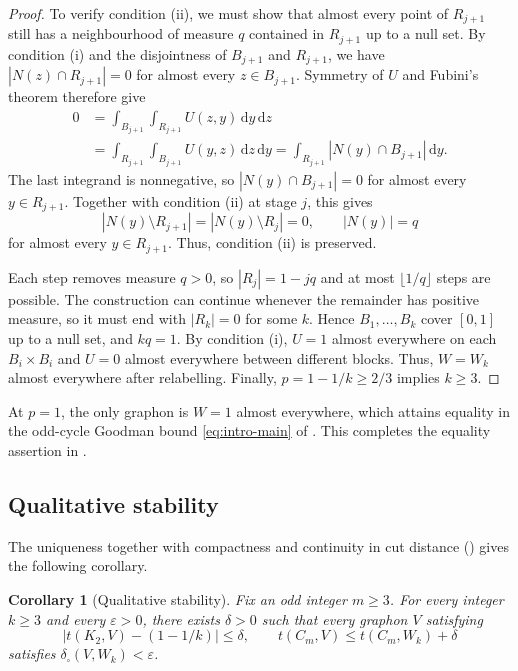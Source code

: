 \documentclass[11pt]{article}
\newtheorem{corollary}[theorem]{Corollary}
\theoremstyle{remark}
\numberwithin{equation}{section}
\newcommand{\dd}{\,\mathrm d}
\newcommand{\tC}[2]{t(C_{#1},#2)}
\newcommand{\edens}[1]{t(K_{2},#1)}
\begin{document}
\begin{proof}
  To verify condition (ii), we must show that almost every point of
  $R_{j+1}$ still has a neighbourhood of measure $q$ contained in
  $R_{j+1}$ up to a null set. By condition (i) and the disjointness of
  $B_{j+1}$ and $R_{j+1}$, we have $|N(z)\cap R_{j+1}|=0$ for almost
  every $z\in B_{j+1}$.
  Symmetry of $U$ and Fubini's theorem therefore give
  \[
    \begin{aligned}
      0&=\int_{B_{j+1}}\int_{R_{j+1}}U(z,y)\dd y\dd z\\
       &=\int_{R_{j+1}}\int_{B_{j+1}}U(y,z)\dd z\dd y
        =\int_{R_{j+1}}|N(y)\cap B_{j+1}|\dd y.
    \end{aligned}
  \]
  The last integrand is nonnegative, so $|N(y)\cap B_{j+1}|=0$
  for almost every $y\in R_{j+1}$. Together with condition (ii) at
  stage $j$, this gives
  \[
    |N(y)\setminus R_{j+1}|=|N(y)\setminus R_j|=0,
    \qquad |N(y)|=q
  \]
  for almost every $y\in R_{j+1}$. Thus, condition (ii) is preserved.

  Each step removes measure $q>0$, so $|R_j|=1-jq$ and at most
  $\lfloor1/q\rfloor$ steps are possible. The construction can continue
  whenever the remainder has positive measure, so it must end with
  $|R_k|=0$ for some $k$. Hence $B_1,\ldots,B_k$ cover $[0,1]$ up to
  a null set, and $kq=1$. By condition (i), $U=1$ almost everywhere on
  each $B_i\times B_i$ and $U=0$ almost everywhere between different
  blocks. Thus, $W=W_k$ almost everywhere after relabelling.
  Finally, $p=1-1/k\ge2/3$ implies $k\ge3$.
\end{proof}

At $p=1$, the only graphon is $W=1$ almost everywhere, which attains equality
in the odd-cycle Goodman bound \eqref{eq:intro-main} of .
This completes the equality assertion in .

\subsection{Qualitative stability}
\label{subsec:qualitative-stability}

The uniqueness together with compactness and continuity in cut distance () gives the following corollary.

\begin{corollary}[Qualitative stability]\label{cor:stability}
  Fix an odd integer $m\ge3$.
  For every integer $k\ge3$ and every $\varepsilon>0$, there exists $\delta>0$ such that every graphon $V$ satisfying
  \[
    \bigl|\edens V-(1-1/k)\bigr|\le\delta,
    \qquad
    \tC mV\le\tC m{W_k}+\delta
  \]
  satisfies $\delta_\square(V,W_k)<\varepsilon$.
\end{corollary}
\end{document}

